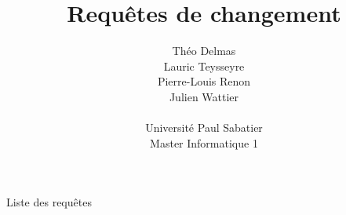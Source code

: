 \documentclass[]{article}
\title{Requêtes de changement}
\author{
    Théo Delmas\\
    Lauric Teysseyre\\
    Pierre-Louis Renon\\
    Julien Wattier\\
    \\
    Université Paul Sabatier\\
    Master Informatique 1\\
   }
\date{}
\begin{document}
\maketitle
\newpage
\tableofcontents
\newpage


\begin{section}{Liste des requêtes}




        


\end{section}
\end{document}
